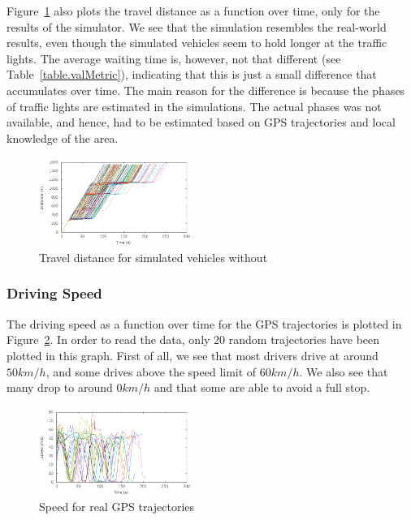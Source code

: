 Figure~\ref{fig:TestResults:distance0} also plots the travel distance as a function over time, only for the results of the simulator.
We see that the simulation resembles the real-world results, even though the simulated vehicles seem to hold longer at the traffic lights. 
The average waiting time is, however, not that different (see Table~\ref{table.valMetric}), indicating that this is just a small difference that accumulates over time.
The main reason for the difference is because the phases of traffic lights are estimated in the simulations. 
The actual phases was not available, and hence, had to be estimated based on GPS trajectories and local knowledge of the area.

\begin{figure}[htb]
\includegraphics[width=0.45\textwidth]{../images/tp0c0_8/distanceUncontrolled0.png}
\caption{Travel distance for simulated vehicles without \tech}
\label{fig:TestResults:distance0}
\end{figure}

\subsubsection{Driving Speed}
The driving speed as a function over time for the GPS trajectories is plotted in Figure~\ref{fig:TestResults:RealSpeed}.
In order to read the data, only 20 random trajectories have been plotted in this graph.
First of all, we see that most drivers drive at around $50 km/h$, and some drives above the speed limit of $60 km/h$. 
We also see that many drop to around $0 km/h$ and that some are able to avoid a full stop.

\begin{figure}[htb]
\includegraphics[width=0.45\textwidth]{../images/Real/RealSpeed.png}
\caption{Speed for real GPS trajectories}
\label{fig:TestResults:RealSpeed}
\end{figure}

